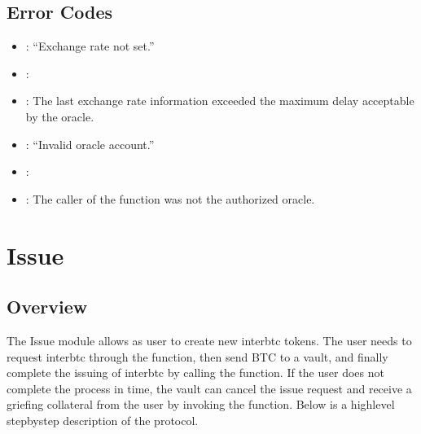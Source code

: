 \documentclass[a4paper,10pt,english]{sphinxmanual}
\begin{document}
\section{Error Codes}
\label{\detokenize{spec/oracle:error-codes}}
\begin{itemize}
\item {} 
: “Exchange rate not set.”

\item {} 
: {\hyperref[\detokenize{spec/oracle:getexchangerate}]{}}

\item {} 
: The last exchange rate information exceeded the maximum delay acceptable by the oracle.

\end{itemize}

\begin{itemize}
\item {} 
: “Invalid oracle account.”

\item {} 
: {\hyperref[\detokenize{spec/oracle:setexchangerate}]{}}

\item {} 
: The caller of the function was not the authorized oracle.

\end{itemize}


\chapter{Issue}
\label{\detokenize{spec/issue:issue}}\label{\detokenize{spec/issue:issue-protocol}}\label{\detokenize{spec/issue::doc}}

\section{Overview}
\label{\detokenize{spec/issue:overview}}
The Issue module allows as user to create new interbtc tokens. The user needs to request interbtc through the {\hyperref[\detokenize{spec/issue:requestissue}]{}} function, then send BTC to a vault, and finally complete the issuing of interbtc by calling the {\hyperref[\detokenize{spec/issue:executeissue}]{}} function. If the user does not complete the process in time, the vault can cancel the issue request and receive a griefing collateral from the user by invoking the {\hyperref[\detokenize{spec/issue:cancelissue}]{}} function. Below is a high\sphinxhyphen{}level step\sphinxhyphen{}by\sphinxhyphen{}step description of the protocol.
\end{document}
